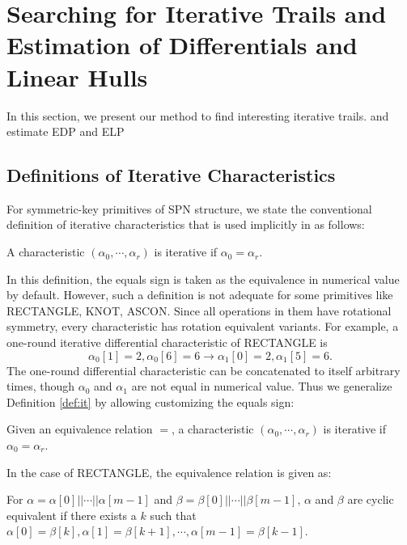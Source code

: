 \section{Searching for Iterative Trails and Estimation of Differentials and Linear Hulls\label{sec:method}}

In this section, we present our method to find interesting iterative trails. and estimate EDP and ELP 

\subsection{Definitions of Iterative Characteristics}

For symmetric-key primitives of SPN structure, we state the conventional definition of iterative characteristics that is used implicitly in \cite{wang2008differential,liu2019iterative} as follows:
\begin{definition}\label{def:it}
	A characteristic $(\alpha_0,\cdots,\alpha_r)$ is iterative if $\alpha_0=\alpha_r$.
\end{definition}

In this definition, the equals sign is taken as the equivalence in numerical value by default. However, such a definition is not adequate for some primitives like RECTANGLE, KNOT, ASCON. Since all operations in them have rotational symmetry, every characteristic has rotation equivalent variants. For example, a one-round iterative differential characteristic of RECTANGLE \cite{zhang2015rectangle} is
\[
	\alpha_0[1]=2,\alpha_0[6]=6\rightarrow \alpha_1[0]=2,\alpha_1[5]=6.
\]
The one-round differential characteristic can be concatenated to itself arbitrary times, though $\alpha_0$ and $\alpha_1$ are not equal in numerical value. Thus we generalize Definition \ref{def:it} by allowing customizing the equals sign:
\begin{definition}\label{def:git}
	Given an equivalence relation $=$, a characteristic $(\alpha_0,\cdots,\alpha_r)$ is iterative if $\alpha_0=\alpha_r$.
\end{definition}
In the case of RECTANGLE, the equivalence relation is given as:

\begin{definition}
	For $\alpha=\alpha[0]||\cdots||\alpha[m-1]$ and $\beta=\beta[0]||\cdots||\beta[m-1]$, $\alpha$ and $\beta$ are cyclic equivalent if there exists a $k$ such that $\alpha[0]=\beta[k],\alpha[1]=\beta[k+1],\cdots,\alpha[m-1]=\beta[k-1]$.
\end{definition}


